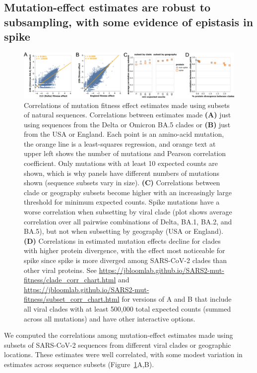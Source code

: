 \documentclass[9pt,twocolumn,twoside]{gsajnl_modified}
\begin{document}
\subsection*{Mutation-effect estimates are robust to subsampling, with some evidence of epistasis in spike}

\begin{figure}
\centering
\includegraphics[width=\linewidth]{figs/corr.png}
\caption{
Correlations of mutation fitness effect estimates made using subsets of natural sequences.
Correlations between estimates made {\bf (A)} just using sequences from the Delta or Omicron BA.5 clades or {\bf (B)} just from the USA or England.
Each point is an amino-acid mutation, the orange line is a least-squares regression, and orange text at upper left shows the number of mutations and Pearson correlation coefficient.
Only mutations with at least 10 expected counts are shown, which is why panels have different numbers of mutations shown (sequence subsets vary in size).
{\bf (C)} Correlations between clade or geography subsets become higher with an increasingly large threshold for minimum expected counts.
Spike mutations have a worse correlation when subsetting by viral clade (plot shows average correlation over all pairwise combinations of Delta, BA.1, BA.2, and BA.5), but not when subsetting by geography (USA or England).
{\bf (D)} Correlations in estimated mutation effects decline for clades with higher protein divergence, with the effect most noticeable for spike since spike is more diverged among SARS-CoV-2 clades than other viral proteins.
See \url{https://jbloomlab.github.io/SARS2-mut-fitness/clade_corr_chart.html} and \url{https://jbloomlab.github.io/SARS2-mut-fitness/subset_corr_chart.html} for versions of A and B that include all viral clades with at least 500,000 total expected counts (summed across all mutations) and have other interactive options.
\label{fig:corr}
}
\end{figure}

We computed the correlations among mutation-effect estimates made using subsets of SARS-CoV-2 sequences from different viral clades or geographic locations.
These estimates were well correlated, with some modest variation in estimates across sequence subsets (Figure~\ref{fig:corr}A,B).
\end{document}
